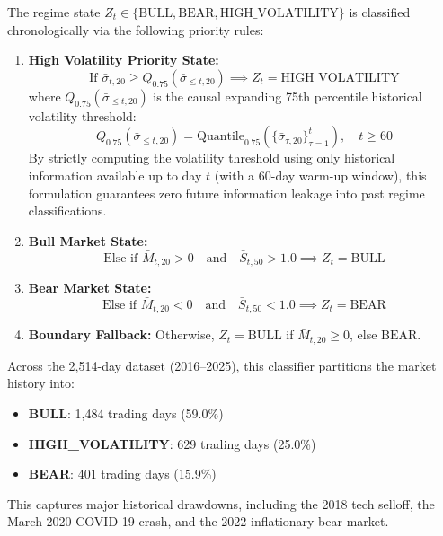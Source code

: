 \documentclass[conference]{IEEEtran}
\begin{document}
The regime state $Z_t \in \{\text{BULL}, \text{BEAR}, \text{HIGH\_VOLATILITY}\}$ is classified chronologically via the following priority rules:
\begin{enumerate}
    \item \textbf{High Volatility Priority State:}
    \begin{equation}
        \text{If } \bar{\sigma}_{t, 20} \ge Q_{0.75}(\bar{\sigma}_{\le t, 20}) \implies Z_t = \text{HIGH\_VOLATILITY}
    \end{equation}
    where $Q_{0.75}(\bar{\sigma}_{\le t, 20})$ is the causal expanding 75th percentile historical volatility threshold:
    \begin{equation}
        Q_{0.75}(\bar{\sigma}_{\le t, 20}) = \text{Quantile}_{0.75}\left( \{\bar{\sigma}_{\tau, 20}\}_{\tau=1}^t \right), \quad t \ge 60
    \end{equation}
    By strictly computing the volatility threshold using only historical information available up to day $t$ (with a 60-day warm-up window), this formulation guarantees zero future information leakage into past regime classifications.
    \item \textbf{Bull Market State:}
    \begin{equation}
        \text{Else if } \bar{M}_{t, 20} > 0 \quad \text{and} \quad \bar{S}_{t, 50} > 1.0 \implies Z_t = \text{BULL}
    \end{equation}
    \item \textbf{Bear Market State:}
    \begin{equation}
        \text{Else if } \bar{M}_{t, 20} < 0 \quad \text{and} \quad \bar{S}_{t, 50} < 1.0 \implies Z_t = \text{BEAR}
    \end{equation}
    \item \textbf{Boundary Fallback:} Otherwise, $Z_t = \text{BULL}$ if $\bar{M}_{t, 20} \ge 0$, else $\text{BEAR}$.
\end{enumerate}

Across the 2,514-day dataset (2016--2025), this classifier partitions the market history into:
\begin{itemize}
    \item \textbf{BULL}: 1,484 trading days (59.0\%)
    \item \textbf{HIGH\_VOLATILITY}: 629 trading days (25.0\%)
    \item \textbf{BEAR}: 401 trading days (15.9\%)
\end{itemize}
This captures major historical drawdowns, including the 2018 tech selloff, the March 2020 COVID-19 crash, and the 2022 inflationary bear market.
\end{document}
